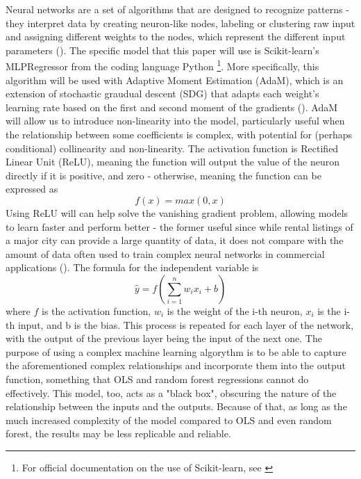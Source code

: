\documentclass[12pt]{report}
\begin{document}
Neural networks are a set of algorithms that are designed to recognize patterns - they interpret data by creating neuron-like nodes, labeling or clustering raw input and assigning different weights to the nodes, which represent the different input parameters (\cite{Schmidhuber2015}). The specific model that this paper will use is Scikit-learn’s MLPRegressor from the coding language Python \footnote{For official documentation on the use of Scikit-learn, see \cite{scikit-learn}}. More specifically, this algorithm will be used with Adaptive Moment Estimation (AdaM), which is an extension of stochastic graudual descent (SDG) that adapts each weight's learning rate based on the first and second moment of the gradients (\cite{kingma2017adam}). AdaM will allow us to introduce non-linearity into the model, particularly useful when the relationship between some coefficients is complex, with potential for (perhaps conditional) collinearity and non-linearity. The activation function is Rectified Linear Unit (ReLU), meaning the function will output the value of the neuron directly if it is positive, and zero - otherwise, meaning the function can be expressed as 
\begin{equation}
f(x) = max(0, x)
\end{equation}
Using ReLU will can help solve the vanishing gradient problem, allowing models to learn faster and perform better - the former useful since while rental listings of a major city can provide a large quantity of data, it does not compare with the amount of data often used to train complex neural networks in commercial applications (\cite{agarap2019deep}). The formula for the independent variable is
\begin{equation}
\hat{y} = f(\sum_{i=1}^{n}w_ix_i + b)
\end{equation}
where $f$ is the activation function, $w_i$ is the weight of the i-th neuron, $x_i$ is the i-th input, and b is the bias. This process is repeated for each layer of the network, with the output of the previous layer being the input of the next one. The purpose of using a complex machine learning algorythm is to be able to capture the aforementioned complex relationships and incorporate them into the output function, something that OLS and random forest regressions cannot do effectively. This model, too, acts as a "black box", obscuring the nature of the relationship between the inputs and the outputs. Because of that, as long as the much increased complexity of the model compared to OLS and even random forest, the results may be less replicable and reliable.
\end{document}
